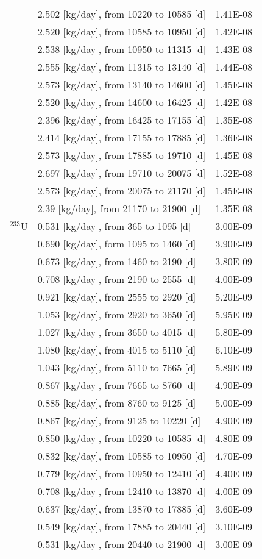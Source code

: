 \begin{longtable}{|p{}|p{}|p{}|}
	& 2.502  [kg/day], from 10220 to 10585 [d]&		1.41E-08	 \\
	& 2.520  [kg/day], from 10585 to 10950 [d]&		1.42E-08	 \\
	&  2.538  [kg/day], from 10950 to 11315 [d]&		1.43E-08	 \\
	&  2.555  [kg/day], from 11315 to 13140 [d]&		1.44E-08	 \\
	&  2.573  [kg/day], from 13140 to 14600 [d]&		1.45E-08	 \\
	&  2.520  [kg/day], from 14600 to 16425 [d]&		1.42E-08	 \\
	& 2.396  [kg/day], from 16425 to 17155 [d]&		1.35E-08	 \\
	&  2.414 [kg/day], from 17155 to 17885 [d]&		1.36E-08	 \\
	& 2.573 [kg/day], from 17885 to 19710 [d]&		1.45E-08	 \\
	&  2.697 [kg/day], from 19710 to 20075 [d]&		1.52E-08	 \\
	&  2.573 [kg/day], from 20075 to 21170 [d]&		1.45E-08	 \\
	&  2.39 [kg/day], from 21170 to 21900 [d]&		1.35E-08	 \\
	\hline
	$^{233}$U &  0.531 [kg/day], from 365 to 1095  [d]	&   3.00E-09  \\
	&  0.690 [kg/day],  form 1095 to 1460 [d] &	3.90E-09 \\
	& 0.673 [kg/day], from 1460 to 2190 [d] &	3.80E-09 \\
	& 0.708  [kg/day], from 2190 to 2555 [d] &	4.00E-09 \\
	& 0.921  [kg/day], from 2555 to 2920 [d] &	5.20E-09 \\
	&   1.053  [kg/day], from 2920 to 3650 [d] &	5.95E-09 \\
	&  1.027 [kg/day], from 3650 to 4015 [d] &	5.80E-09 \\
	&  1.080  [kg/day], from 4015 to 5110 [d] &	6.10E-09 \\
	&  1.043  [kg/day], from 5110 to 7665 [d] &	5.89E-09 \\
	&  0.867  [kg/day], from 7665 to 8760 [d] &	4.90E-09 \\
	&  0.885  [kg/day], from 8760 to 9125 [d] &	5.00E-09 \\
	&  0.867  [kg/day], from 9125 to 10220 [d] &	4.90E-09 \\
	&  0.850 [kg/day], from 10220 to 10585 [d] &	4.80E-09 \\
	& 0.832  [kg/day], from 10585 to 10950 [d] &	4.70E-09 \\
	& 0.779   [kg/day], from 10950 to 12410 [d] &	4.40E-09 \\
	& 0.708  [kg/day], from 12410 to 13870 [d] &	4.00E-09 \\
	&  0.637  [kg/day], from 13870 to 17885 [d] &	3.60E-09 \\
	&  0.549  [kg/day], from 17885 to 20440 [d] &	3.10E-09 \\
	& 0.531 [kg/day], from 20440 to 21900 [d] &	3.00E-09 \\
	\hline
	
\end{longtable}	

